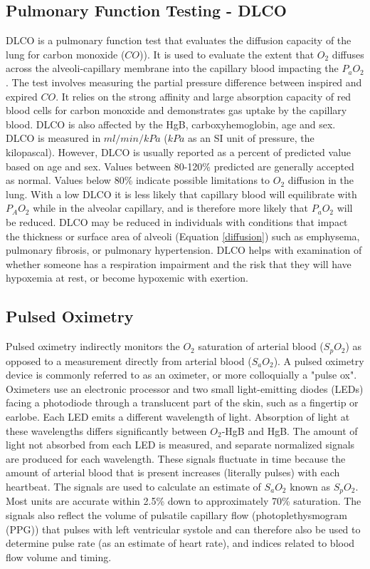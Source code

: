 \subsection{Pulmonary Function Testing - DLCO}
DLCO is a pulmonary function test that evaluates the diffusion capacity of the lung for carbon monoxide ($CO$)). It is used to evaluate the extent that $O_2$ diffuses across the alveoli-capillary membrane into the capillary blood impacting the $P_aO_2$. The test involves measuring the partial pressure difference between inspired and expired $CO$. It relies on the strong affinity and large absorption capacity of red blood cells for carbon monoxide and demonstrates gas uptake by the capillary blood. DLCO is also affected by the HgB, carboxyhemoglobin, age and sex. DLCO is measured in $ml/min/kPa$ ($kPa$ as an SI unit of pressure, the kilopascal). However, DLCO is usually reported as a percent of predicted value based on age and sex. Values between 80-120\% predicted are generally accepted as normal. Values below 80\% indicate possible limitations to $O_2$ diffusion in the lung. With a low DLCO it is less likely that capillary blood will equilibrate with $P_AO_2$ while in the alveolar capillary, and is therefore more likely that $P_aO_2$ will be reduced.
DLCO may be reduced in individuals with conditions that impact the thickness or surface area of alveoli (Equation \ref{diffusion}) such as emphysema, pulmonary fibrosis, or pulmonary hypertension.
DLCO helps with examination of whether someone has a respiration impairment and the risk that they will have hypoxemia at rest, or become hypoxemic with exertion.

\subsection{Pulsed Oximetry}

Pulsed oximetry indirectly monitors the $O_2$ saturation of arterial blood ($S_pO_2$) as opposed to a measurement directly from arterial blood ($S_aO_2$). A pulsed oximetry device is commonly referred to as an oximeter, or more colloquially a "pulse ox". 
Oximeters use an electronic processor and two small light-emitting diodes (LEDs) facing a photodiode through a translucent part of the skin, such as a fingertip or earlobe. Each LED emits a different wavelength of light. Absorption of light at these wavelengths differs significantly between $O_2$-HgB and HgB. The amount of light not absorbed from each LED is measured, and separate normalized signals are produced for each wavelength. These signals fluctuate in time because the amount of arterial blood that is present increases (literally pulses) with each heartbeat. The signals are used to calculate an estimate of $S_aO_2$ known as $S_pO_2$. Most units are accurate within 2.5\% down to approximately 70\% saturation. The signals also reflect the volume of pulsatile capillary flow (photoplethysmogram (PPG)) that pulses with left ventricular systole and can therefore also be used to determine pulse rate (as an estimate of heart rate), and indices related to blood flow volume and timing.

